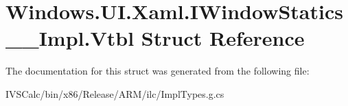 \hypertarget{struct_windows_1_1_u_i_1_1_xaml_1_1_i_window_statics_____impl_1_1_vtbl}{}\section{Windows.\+U\+I.\+Xaml.\+I\+Window\+Statics\+\_\+\+\_\+\+Impl.\+Vtbl Struct Reference}
\label{struct_windows_1_1_u_i_1_1_xaml_1_1_i_window_statics_____impl_1_1_vtbl}


The documentation for this struct was generated from the following file\+:\begin{DoxyCompactItemize}
\item 
I\+V\+S\+Calc/bin/x86/\+Release/\+A\+R\+M/ilc/Impl\+Types.\+g.\+cs\end{DoxyCompactItemize}

